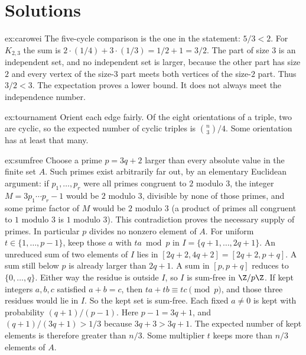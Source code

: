 \section{Solutions}

\begin{solution}{ex:carowei}
\writeup The five-cycle comparison is the one in the statement: $5/3<2$. For $K_{2,3}$ the sum is $2\cdot(1/4)+3\cdot(1/3)=1/2+1=3/2$. The part of size $3$ is an independent set, and no independent set is larger, because the other part has size $2$ and every vertex of the size-$3$ part meets both vertices of the size-$2$ part. Thus $3/2<3$. The expectation proves a lower bound. It does not always meet the independence number.
\end{solution}

\begin{solution}{ex:tournament}
\writeup Orient each edge fairly. Of the eight orientations of a triple, two are cyclic, so the expected number of cyclic triples is $\binom{n}{3}/4$. Some orientation has at least that many.
\end{solution}

\begin{solution}{ex:sumfree}
\writeup Choose a prime $p=3q+2$ larger than every absolute value in the finite set $A$. Such primes exist arbitrarily far out, by an elementary Euclidean argument: if $p_1,\ldots,p_r$ were all primes congruent to $2$ modulo $3$, the integer $M=3p_1\cdots p_r-1$ would be $2$ modulo $3$, divisible by none of those primes, and some prime factor of $M$ would be $2$ modulo $3$ (a product of primes all congruent to $1$ modulo $3$ is $1$ modulo $3$). This contradiction proves the necessary supply of primes. In particular $p$ divides no nonzero element of $A$. For uniform $t\in\{1,\ldots,p-1\}$, keep those $a$ with $ta\bmod p$ in $I=\{q+1,\ldots,2q+1\}$. An unreduced sum of two elements of $I$ lies in $[2q+2,4q+2]=[2q+2,p+q]$. A sum still below $p$ is already larger than $2q+1$. A sum in $[p,p+q]$ reduces to $\{0,\ldots,q\}$. Either way the residue is outside $I$, so $I$ is sum-free in $\Z/p\Z$. If kept integers $a,b,c$ satisfied $a+b=c$, then $ta+tb\equiv tc\pmod p$, and those three residues would lie in $I$. So the kept set is sum-free. Each fixed $a\ne0$ is kept with probability $(q+1)/(p-1)$. Here $p-1=3q+1$, and $(q+1)/(3q+1)>1/3$ because $3q+3>3q+1$. The expected number of kept elements is therefore greater than $n/3$. Some multiplier $t$ keeps more than $n/3$ elements of $A$.
\end{solution}

